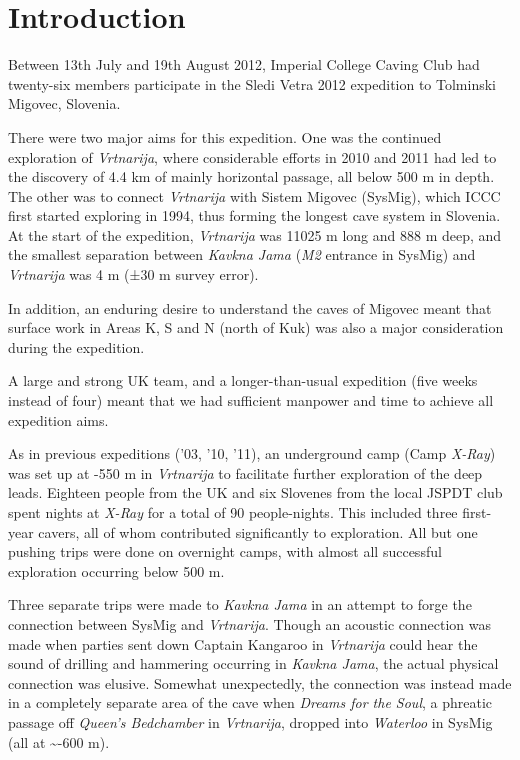 \hypertarget{introduction-3}{%
\section{Introduction}\label{introduction-3}}

Between 13th July and 19th August 2012, Imperial College Caving Club had
twenty-six members participate in the Sledi Vetra
 2012 expedition to Tolminski Migovec,
Slovenia.

There were two major aims for this expedition. One was the continued
exploration of \emph{Vrtnarija}, where considerable efforts in 2010 and
2011 had led to the discovery of 4.4 km of mainly horizontal passage,
all below 500 m in depth. The other was to connect \emph{Vrtnarija} with
Sistem Migovec (SysMig), which ICCC first started exploring in 1994,
thus forming the longest cave system in Slovenia. At the start of the
expedition, \emph{Vrtnarija} was 11025 m long and 888 m deep, and the
smallest separation between \emph{Kavkna Jama} (\emph{M2} entrance in
SysMig) and \emph{Vrtnarija} was 4 m (±30 m survey error).

In addition, an enduring desire to understand the caves of Migovec meant
that surface work in Areas K, S and N (north of Kuk) was also a major
consideration during the expedition.

A large and strong UK team, and a longer-than-usual expedition (five
weeks instead of four) meant that we had sufficient manpower and time to
achieve all expedition aims.

As in previous expeditions ('03, '10, '11), an underground camp (Camp
\emph{X-Ray}) was set up at -550 m in \emph{Vrtnarija} to facilitate
further exploration of the deep leads. Eighteen people from the UK and
six Slovenes from the local JSPDT club spent nights at \emph{X-Ray} for
a total of 90 people-nights. This included three first-year cavers, all
of whom contributed significantly to exploration. All but one pushing
trips were done on overnight camps, with almost all successful
exploration occurring below 500 m.

Three separate trips were made to \emph{Kavkna Jama} in an attempt to
forge the connection between SysMig and \emph{Vrtnarija}. Though an
acoustic connection was made when parties sent down Captain Kangaroo in
\emph{Vrtnarija} could hear the sound of drilling and hammering
occurring in \emph{Kavkna Jama}, the actual physical connection was
elusive. Somewhat unexpectedly, the connection was instead made in a
completely separate area of the cave when \emph{Dreams for the Soul}, a
phreatic passage off \emph{Queen's Bedchamber} in \emph{Vrtnarija},
dropped into \emph{Waterloo} in SysMig (all at \textasciitilde -600 m).

